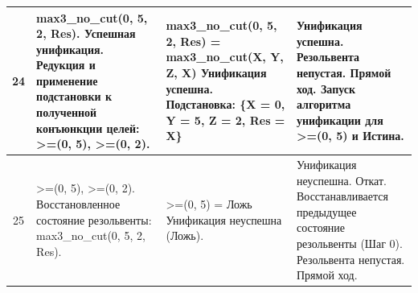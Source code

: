 \begin{tabularx}{\textwidth}{|c|>{\small}X|>{\small}X|>{\small}X|}
	24                                                                                 &
	max3\_no\_cut(0, 5, 2, Res). \newline
	Успешная унификация. \newline
	Редукция и применение подстановки к полученной конъюнкции целей: \newline
	>=(0, 5), \newline
	>=(0, 2).                                                                          &
	max3\_no\_cut(0, 5, 2, Res) = max3\_no\_cut(X, Y, Z, X) \newline
	Унификация успешна. \newline
	Подстановка: \newline
	\{X = 0, Y = 5, Z = 2, Res = X\}                                                   &
	Унификация успешна. \newline
	Резольвента непустая. \newline
	Прямой ход. \newline
	Запуск алгоритма унификации для >=(0, 5) и Истина.                                           \\
	\hline

	25                                                                                 &
	>=(0, 5), \newline
	>=(0, 2). \newline
	Восстановленное состояние резольвенты: \newline
	max3\_no\_cut(0, 5, 2, Res).                                                       &
	>=(0, 5) = \newline
	Ложь \newline
	Унификация неуспешна (Ложь).                                                       &
	Унификация неуспешна. \newline
	Откат. Восстанавливается предыдущее состояние резольвенты (Шаг 0). \newline
	Резольвента непустая. \newline
	Прямой ход.                                                                                  \\
	\hline


\end{tabularx}
